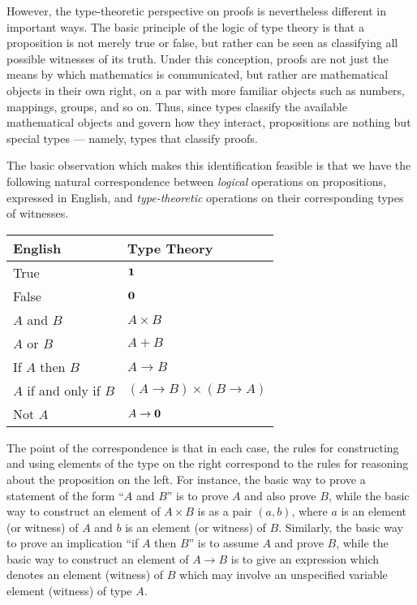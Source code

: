 However, the type-theoretic perspective on proofs is nevertheless different in important ways.
The basic principle of the logic of type theory is that a proposition is not merely true or false, but rather can be seen as classifying all possible witnesses of its truth.
Under this conception, proofs are not just the means by which mathematics is communicated, but rather are mathematical objects in their own right, on a par with more familiar objects such as numbers, mappings, groups, and so on.
Thus, since types classify the available mathematical objects and govern how they interact, propositions are nothing but special  types --- namely, types that classify proofs.

The basic observation which makes this identification feasible is that we have the following natural correspondence between \emph{logical} operations on propositions, expressed in English, and \emph{type-theoretic} operations on their corresponding types of witnesses.
\begin{center}
\medskip
\begin{tabular}{ll}
  \toprule
  English & Type Theory\\
  \midrule
  True & $\mathbf{1}$ \\
  False & $\mathbf{0}$ \\
  $A$ and $B$ & $A \times B$ \\
  $A$ or $B$ & $A + B$ \\
  If $A$ then $B$ & $A \to B$ \\
  $A$ if and only if $B$ & $(A \to B) \times (B \to A)$ \\
  Not $A$ &  $A \to \mathbf{0}$ \\
  \bottomrule
\end{tabular}
\medskip
\end{center}

The point of the correspondence is that in each case, the rules for constructing and using elements of the type on the right correspond to the rules for reasoning about the proposition on the left.
For instance, the basic way to prove a statement of the form ``$A$ and $B$'' is to prove $A$ and also prove $B$, while the basic way to construct an element of $A\times B$ is as a pair $(a,b)$, where $a$ is an element (or witness) of $A$ and $b$ is an element (or witness) of $B$.
Similarly, the basic way to prove an implication ``if $A$ then $B$'' is to assume $A$ and prove $B$, while the basic way to construct an element of $A\to B$ is to give an expression which denotes an element (witness) of $B$ which may involve an unspecified variable element (witness) of type $A$.

